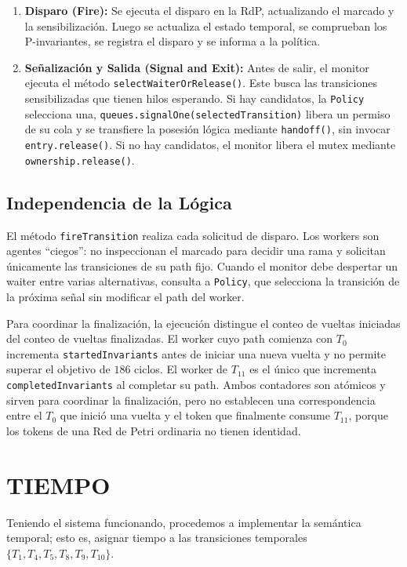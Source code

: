 \documentclass[11pt,a4paper]{article}
\begin{document}
\begin{enumerate}
\begin{itemize}
          \end{itemize}
          \item \textbf{Disparo (Fire):} Se ejecuta el disparo en la RdP, actualizando el marcado y la sensibilización. Luego se actualiza el estado temporal, se comprueban los P-invariantes, se registra el disparo y se informa a la política.
          \item \textbf{Señalización y Salida (Signal and Exit):} Antes de salir, el monitor ejecuta el método \texttt{selectWaiterOrRelease()}. Este busca las transiciones sensibilizadas que tienen hilos esperando. Si hay candidatos, la \texttt{Policy} selecciona una, \texttt{queues.signalOne(selectedTransition)} libera un permiso de su cola y se transfiere la posesión lógica mediante \texttt{handoff()}, sin invocar \texttt{entry.release()}. Si no hay candidatos, el monitor libera el mutex mediante \texttt{ownership.release()}.
\end{enumerate}

\subsection{Independencia de la Lógica}

El método \texttt{fireTransition} realiza cada solicitud de disparo. Los workers
son agentes ``ciegos'': no inspeccionan el marcado para decidir una rama y
solicitan únicamente las transiciones de su path fijo. Cuando el monitor debe
despertar un waiter entre varias alternativas, consulta a \texttt{Policy}, que
selecciona la transición de la próxima señal sin modificar el path del worker.

Para coordinar la finalización, la ejecución distingue el conteo de vueltas
iniciadas del conteo de vueltas finalizadas. El worker cuyo path comienza con
$T_0$ incrementa \texttt{startedInvariants} antes de iniciar una nueva vuelta
y no permite superar el objetivo de $186$ ciclos. El worker de $T_{11}$ es el
único que incrementa \texttt{completedInvariants} al completar su path. Ambos
contadores son atómicos y sirven para coordinar la finalización, pero no
establecen una correspondencia entre el $T_0$ que inició una vuelta y el token
que finalmente consume $T_{11}$, porque los tokens de una Red de Petri
ordinaria no tienen identidad.

\section{TIEMPO}

Teniendo el sistema funcionando, procedemos a implementar la semántica temporal; esto es, asignar tiempo a las transiciones temporales $\{T_1, T_4, T_5, T_8, T_9, T_{10}\}$.
\end{document}

